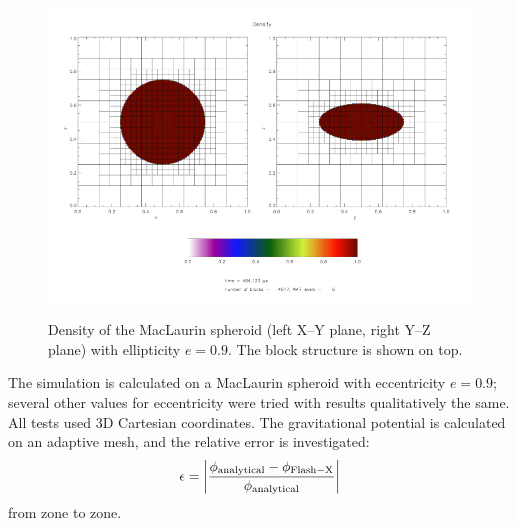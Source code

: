 \begin{figure}[!ht]
\begin{center}
{\leavevmode\includegraphics[width=150mm]{Maclaurin_density}}
\end{center}
\label{Fig:Maclaurin_density}
\caption{Density of the MacLaurin spheroid (left X--Y plane, right Y--Z plane) with ellipticity
$e=0.9$.  The \flashx block structure is shown on top.}
\end{figure}

The simulation is calculated on a MacLaurin spheroid with eccentricity $e=0.9$; several other values for eccentricity were tried with results qualitatively the same.
All tests used 3D Cartesian coordinates. 
The gravitational potential is calculated on an adaptive mesh, and the relative error is investigated: 
\begin{equation}
\label{Eqn:Maclaurin_error}
\epsilon = \left| \frac{\phi_{\rm analytical} - \phi_{\rm Flash-X}}{\phi_{\rm analytical}} \right|
\end{equation}
from zone to zone. 

